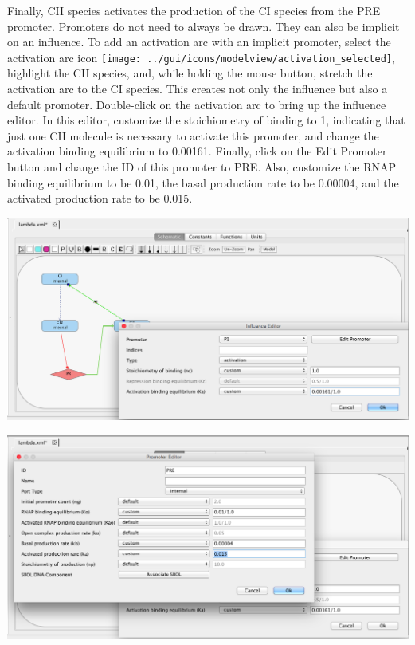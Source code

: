 \documentclass[titlepage,11pt]{article}
\begin{document}
Finally, CII species activates the production of the CI species from the PRE promoter.  Promoters do not need to always be drawn.  They can also be implicit on an influence.  To add an activation arc with an implicit promoter, select the activation arc icon \texttt{[image: ../gui/icons/modelview/activation\_selected]}, highlight the CII species, and, while holding the mouse button, stretch the activation arc to the CI species.  This creates not only the influence but also a default promoter.  Double-click on the activation arc to bring up the influence editor.  In this editor, customize the stoichiometry of binding to 1, indicating that just one CII molecule is necessary to activate this promoter, and change the activation binding equilibrium to 0.00161.  Finally, click on the Edit Promoter button and change the ID of this promoter to PRE.  Also, customize the RNAP binding equilibrium to be 0.01, the basal production rate to be 0.00004, and the activated production rate to be 0.015.

\begin{center}
\includegraphics[width=160mm]{screenshots/activation}
\end{center}

\begin{center}
\includegraphics[width=160mm]{screenshots/activated_promoter}
\end{center}
\end{document}
